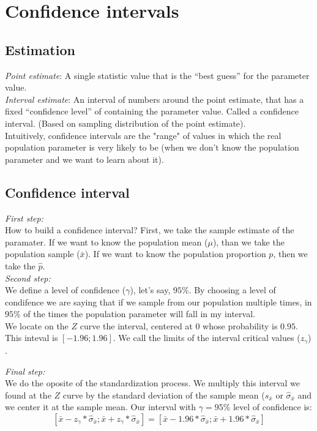 \documentclass[11pt]{article}
\begin{document}
\section{Confidence intervals}

	\subsection*{Estimation}
\emph{Point estimate}: A single statistic value that is the “best guess” for
the parameter value.\\

\emph{Interval estimate}: An interval of numbers around the point estimate, that has a fixed “confidence level” of containing the parameter value. Called a confidence interval. (Based on sampling distribution of the point estimate).\\

	Intuitively, confidence intervals are the "range" of values in which the real population parameter is very likely to be (when we don't know the population parameter and we want to learn about it).

	\subsection*{Confidence interval}
	
	\emph{First step:}\\
	
	How to build a confidence interval? First, we take the sample estimate of the paramater. If we want to know the population mean ($\mu$), than we take the population sample ($\bar{x}$). If we want to know the population proportion $p$, then we take the $\hat{p}$.\\

	\emph{Second step:}\\

	We define a level of confidence ($\gamma$), let's say, $95\%$. By choosing a level of condifence we are saying that if we sample from our population multiple times, in $95\%$ of the times the population parameter will fall in my interval.\\
	
	We locate on the $Z$ curve the interval, centered at $0$ whose probability is $0.95$. This inteval is $[-1.96;1.96]$. We call the limits of the interval critical values ($z_\gamma$) .

	\emph{Final step:}\\

	We do the oposite of the standardization process. We multiply this interval we found at the $Z$ curve by the standard deviation of the sample mean ($s_{\bar{x}}$ or $\hat{\sigma}_{\bar{x}}$ and we center it at the sample mean. Our interval with $\gamma = 95\%$ level of confidence is:
	\[[\bar{x}-z_\gamma*\hat{\sigma}_{\bar{x}};\bar{x}+z_\gamma*\hat{\sigma}_{\bar{x}}] = [\bar{x}-1.96*\hat{\sigma}_{\bar{x}};\bar{x}+1.96*\hat{\sigma}_{\bar{x}}]\]
\end{document}
